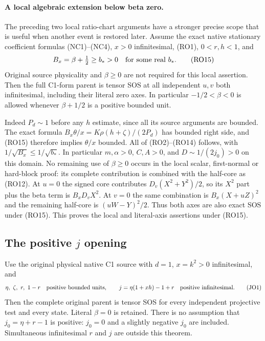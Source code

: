 \paragraph{A local algebraic extension below beta zero.}
The preceding two local ratio-chart arguments have a stronger precise
scope that is useful when another event is restored later. Assume the
exact native stationary coefficient formulas (NC1)--(NC4),
$x>0$ infinitesimal, (RO1), $0<r,h<1$, and
\[
              B_x=\beta+\tfrac12\ge b_*>0
              \quad\hbox{for some real }b_* .                 \tag{RO15}
\]
Original source physicality and $\beta\ge0$ are not required for
this local assertion. Then the full C1-form parent is tensor SOS at
all independent $u,v$ both infinitesimal, including their literal
zero axes. In particular $-1/2<\beta<0$ is allowed whenever
$\beta+1/2$ is a positive bounded unit.

Indeed $P_d\sim1$ before any $h$ estimate, since all its source
arguments are bounded. The exact formula
$B_x\theta/x=K\rho(h+\zeta)/(2P_d)$ has bounded right side,
and (RO15) therefore implies $\theta/x$ bounded. All of (RO2)--(RO14)
follows, with $1/\sqrt{B_x}\le1/\sqrt{b_*}$. In particular
$m,\alpha>0$, $C,A>0$, and $D\sim1/(2j_0)>0$ on this
domain. No remaining use of $\beta\ge0$ occurs in the local
scalar, first-normal or hard-block proof: its complete contribution
is combined with the half-core as (RO12). At $u=0$ the signed
core contributes $D_v(X^2+Y^2)/2$, so its $X^2$ part plus
the beta term is $B_xD_vX^2$. At $v=0$ the same combination
is $B_x(X+uZ)^2$ and the remaining half-core is
$(uW-Y)^2/2$. Thus both axes are also exact SOS under (RO15).
This proves the local and literal-axis assertions under (RO15).



\subsection{The positive $j$ opening}

\label{component:p48da253a150f}

\label{p48da253a150f:sec:r13-c1-j-opening}

\begin{theorem}
Use the original physical native C1 source with $d=1$, $x=k^2>0$
infinitesimal, and
\[
 \eta,\ \zeta,\ r,\ 1-r\quad\hbox{positive bounded units},\qquad
 j=\eta(1+xh)-1+r\quad\hbox{positive infinitesimal}.       \tag{JO1}
\]
Then the complete original parent is tensor SOS for every independent
projective test and every state. Literal $\beta=0$ is retained.
There is no assumption that $j_0=\eta+r-1$ is positive: $j_0=0$
and a slightly negative $j_0$ are included. Simultaneous infinitesimal
$r$ and $j$ are outside this theorem.
\end{theorem}

